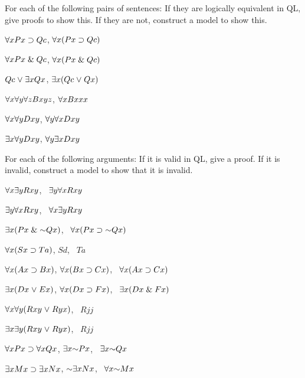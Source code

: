 \solutions
\problempart
\label{pr.QLequivornot}
For each of the following pairs of sentences: If they are logically equivalent in QL, give proofs to show this. If they are not, construct a model to show this.
\begin{earg}
\item $\forall x Px \supset Qc$, $\forall x (Px \supset Qc)$
\item $\forall x Px \mathrel\& Qc$, $\forall x (Px \mathrel\& Qc)$
\item $Qc \mkern1mu\vee\mkern1mu \exists x Qx$, $\exists x (Qc \mkern1mu\vee\mkern1mu Qx)$
\item $\forall x\forall y \forall z Bxyz$, $\forall x Bxxx$
\item $\forall x\forall y Dxy$, $\forall y\forall x Dxy$
\item $\exists x\forall y Dxy$, $\forall y\exists x Dxy$
\end{earg}

\solutions
\problempart
\label{pr.QLvalidornot}
For each of the following arguments: If it is valid in QL, give a proof. If it is invalid, construct a model to show that it is invalid.
\begin{earg}
\item $\forall x\exists y Rxy$, \therefore\ $\exists y\forall x Rxy$
\item $\exists y\forall x Rxy$, \therefore\ $\forall x\exists y Rxy$
\item $\qt{\exists}{x}(Px \eand \enot Qx)$, \therefore\ $\qt{\forall}{x}(Px \eif \enot Qx)$
\item $\forall x(Sx \supset Ta)$, $Sd$, \therefore\ $Ta$
\item $\forall x(Ax\supset Bx)$, $\forall x(Bx \supset Cx)$, \therefore\ $\forall x(Ax \supset Cx)$
\item $\exists x(Dx \mkern1mu\vee\mkern1mu Ex)$, $\forall x(Dx \supset Fx)$, \therefore\ $\exists x(Dx \mathrel\& Fx)$
\item $\forall x\forall y(Rxy \mkern1mu\vee\mkern1mu Ryx)$, \therefore\ $Rjj$
\item $\exists x\exists y(Rxy \mkern1mu\vee\mkern1mu Ryx)$, \therefore\ $Rjj$
\item $\forall x Px \supset \forall x Qx$, $\qt{\exists}{x} \enot Px$, \therefore\ $\qt{\exists}{x} \enot Qx$
\item $\exists x Mx \supset \exists x Nx$, $\enot \qt{\exists}{x} Nx$, \therefore\ $\qt{\forall}{x} \enot Mx$
\end{earg}

